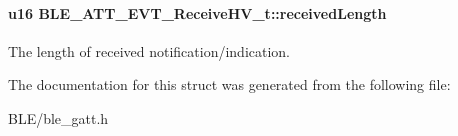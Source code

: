 \paragraph[{\texorpdfstring{received\+Length}{receivedLength}}]{\setlength{\rightskip}{0pt plus 5cm}u16 B\+L\+E\+\_\+\+A\+T\+T\+\_\+\+E\+V\+T\+\_\+\+Receive\+H\+V\+\_\+t\+::received\+Length}\hypertarget{struct_b_l_e___a_t_t___e_v_t___receive_h_v__t_a8ca377a650674ef7edb5b690de7a22f4}{}\label{struct_b_l_e___a_t_t___e_v_t___receive_h_v__t_a8ca377a650674ef7edb5b690de7a22f4}
The length of received notification/indication. 

The documentation for this struct was generated from the following file\+:\begin{DoxyCompactItemize}
\item 
B\+L\+E/ble\+\_\+gatt.\+h\end{DoxyCompactItemize}
